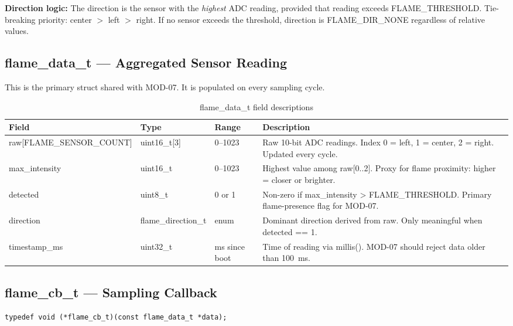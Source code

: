\documentclass[12pt]{article}
\newcommand{\fn}[1]{{\footnotesize\ttfamily #1}}
\begin{document}
\begin{notebox}
\textbf{Direction logic:} The direction is the sensor with the \emph{highest} ADC reading, provided that reading exceeds \fn{FLAME\_THRESHOLD}. Tie-breaking priority: center $>$ left $>$ right. If no sensor exceeds the threshold, direction is \fn{FLAME\_DIR\_NONE} regardless of relative values.
\end{notebox}

\subsection{\fn{flame\_data\_t} --- Aggregated Sensor Reading}

This is the primary struct shared with MOD-07. It is populated on every sampling cycle.

\begin{table}[H]
\centering\small
\begin{tabularx}{\textwidth}{L{3.8cm} L{2.5cm} L{2cm} X}
\toprule
\textbf{Field} & \textbf{Type} & \textbf{Range} & \textbf{Description} \\
\midrule
\fn{raw[FLAME\_SENSOR\_COUNT]} & \fn{uint16\_t[3]} & 0--1023 & Raw 10-bit ADC readings. Index 0 = left, 1 = center, 2 = right. Updated every cycle. \\
\fn{max\_intensity}  & \fn{uint16\_t}       & 0--1023       & Highest value among \fn{raw[0..2]}. Proxy for flame proximity: higher = closer or brighter. \\
\fn{detected}        & \fn{uint8\_t}        & 0 or 1        & Non-zero if \fn{max\_intensity > FLAME\_THRESHOLD}. Primary flame-presence flag for MOD-07. \\
\fn{direction}       & \fn{flame\_direction\_t} & enum      & Dominant direction derived from \fn{raw}. Only meaningful when \fn{detected == 1}. \\
\fn{timestamp\_ms}   & \fn{uint32\_t}       & ms since boot & Time of reading via \fn{millis()}. MOD-07 should reject data older than 100~ms. \\
\bottomrule
\end{tabularx}
\caption{\fn{flame\_data\_t} field descriptions}
\end{table}

\subsection{\fn{flame\_cb\_t} --- Sampling Callback}

\begin{lstlisting}[caption={Callback typedef}]
typedef void (*flame_cb_t)(const flame_data_t *data);
\end{lstlisting}
\end{document}
